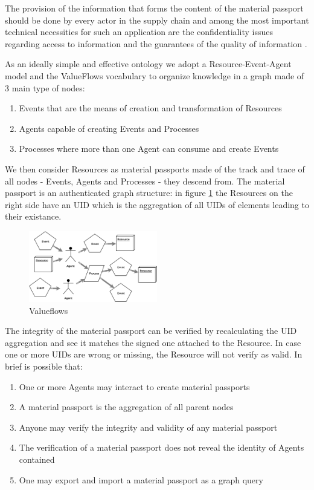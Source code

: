 \documentclass[twocolumn]{article}
\begin{document}
The provision of the information that forms the content of the material
passport should be done by every actor in the supply chain and among the
most important technical necessities for such an application are the
confidentiality issues regarding access to information and the
guarantees of the quality of information \citep{resources-passport}.

As an ideally simple and effective ontology we adopt a
Resource-Event-Agent model \citep{REA} and the ValueFlows vocabulary
\citep{valueflows} to organize knowledge in a graph made of 3 main
type of nodes:

\begin{enumerate}
  \item Events that are the means of creation and transformation of Resources
  \item Agents capable of creating Events and Processes
  \item Processes where more than one Agent can consume and create Events
\end{enumerate}

We then consider Resources as material passports made of the track and
trace of all nodes - Events, Agents and Processes - they descend from.
The  material passport is an authenticated graph structure: in figure
\ref{fig:valueflows} the Resources on the right side have an UID which
is the aggregation of all UIDs of elements leading to their existance.

\begin{figure}
  \caption{Valueflows}
  \label{fig:valueflows}
  \centering
  \includegraphics[width=0.5\textwidth]{valueflows.eps}
\end{figure}

The integrity of the material passport can be verified by recalculating
the UID aggregation and see it matches the signed one attached to the
Resource. In case one or more UIDs are wrong or missing, the Resource
will not verify as valid. In brief is possible that:

\begin{enumerate}
  \item One or more Agents may interact to create material passports
  \item A material passport is the aggregation of all parent nodes
  \item Anyone may verify the integrity and validity of any material passport
  \item The verification of a material passport does not reveal the identity of Agents contained
  \item One may export and import a material passport as a graph query
\end{enumerate}
\end{document}
